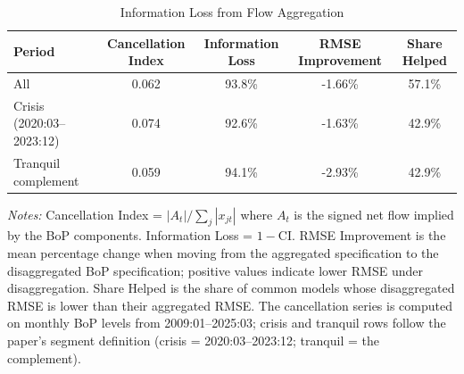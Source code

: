 \begin{table}[htbp]
\centering
\caption{Information Loss from Flow Aggregation}
\label{tab:info_loss}
\begin{tabular}{lcccc}
\toprule
Period & Cancellation Index & Information Loss & RMSE Improvement & Share Helped \\
\midrule
All & 0.062 & 93.8\% & -1.66\% & 57.1\% \\
Crisis (2020:03--2023:12) & 0.074 & 92.6\% & -1.63\% & 42.9\% \\
Tranquil complement & 0.059 & 94.1\% & -2.93\% & 42.9\% \\
\bottomrule
\end{tabular}
\begin{tablenotes}
\small
\item \textit{Notes:} Cancellation Index = $|A_t|/\sum_j |x_{jt}|$ where $A_t$ is the signed net flow implied by the BoP components. Information Loss = $1 - \text{CI}$. RMSE Improvement is the mean percentage change when moving from the aggregated specification to the disaggregated BoP specification; positive values indicate lower RMSE under disaggregation. Share Helped is the share of common models whose disaggregated RMSE is lower than their aggregated RMSE. The cancellation series is computed on monthly BoP levels from 2009:01--2025:03; crisis and tranquil rows follow the paper's segment definition (crisis = 2020:03--2023:12; tranquil = the complement).
\end{tablenotes}
\end{table}
